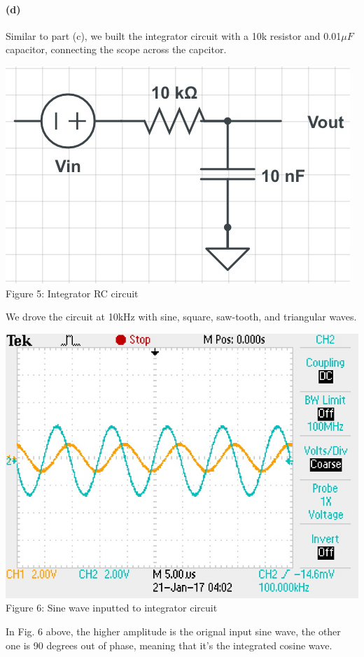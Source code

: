 \documentclass[]{article}
\begin{document}
	\paragraph{ (d)}
	Similar to part (c), we built the integrator circuit with a 10k resistor and 0.01$\mu F$ capacitor, connecting the scope across the capcitor. 
\begin{center}
	\includegraphics[scale=0.4]{lab2_integrator}\\
	Figure 5: Integrator RC circuit
\end{center}
We drove the circuit at 10kHz with sine, square, saw-tooth, and triangular waves. 
\begin{center}
	\includegraphics[scale=0.7]{d_sine}\\
	Figure 6: Sine wave inputted to integrator circuit
\end{center}
In Fig. 6 above, the higher amplitude is the orignal input sine wave, the other one is 90 degrees out of phase, meaning that it's the integrated cosine wave. \\ 
\end{document}
